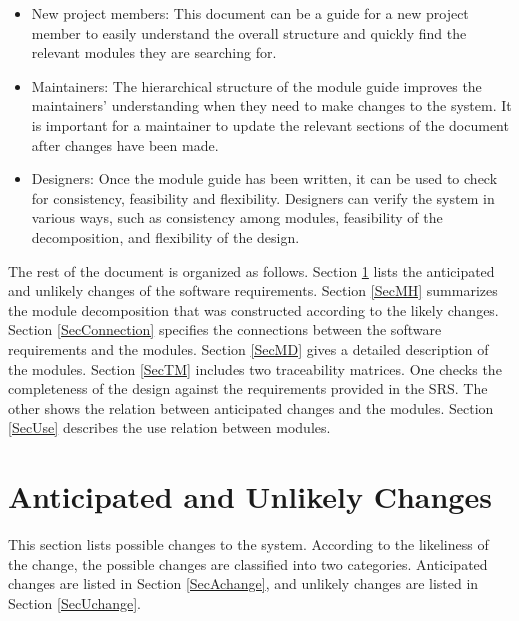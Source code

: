 \documentclass[12pt, titlepage]{article}
\begin{document}
	\begin{itemize}
	\item New project members: This document can be a guide for a new project 
	member to easily understand the overall structure and quickly find the 
	relevant modules they are searching for.
	\item Maintainers: The hierarchical structure of the module guide improves 
	the maintainers' understanding when they need to make changes to the 
	system. It is important for a maintainer to update the relevant sections of 
	the document after changes have been made.
	\item Designers: Once the module guide has been written, it can be used to 
	check for consistency, feasibility and flexibility. Designers can verify 
	the system in various ways, such as consistency among modules, feasibility 
	of the decomposition, and flexibility of the design.
	\end{itemize}
	The rest of the document is organized as follows. Section \ref{SecChange} 
	lists the anticipated and unlikely changes of the software requirements. 
	Section \ref{SecMH} summarizes the module decomposition that was 
	constructed according to the likely changes. Section \ref{SecConnection} 
	specifies the connections between the software requirements and the
	modules. Section \ref{SecMD} gives a detailed description of the
	modules. Section \ref{SecTM} includes two traceability matrices. One checks
	the completeness of the design against the requirements provided in the 
	SRS. The other shows the relation between anticipated changes and the 
	modules. Section \ref{SecUse} describes the use relation between modules.
	\section{Anticipated and Unlikely Changes} \label{SecChange} This section 
	lists possible changes to the system. According to the likeliness of the 
	change, the possible changes are classified into two categories. 
	Anticipated changes are listed in Section \ref{SecAchange}, and unlikely 
	changes are listed in Section \ref{SecUchange}.
\end{document}
